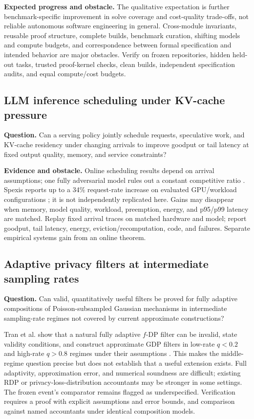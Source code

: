 \documentclass[11pt]{article}
\begin{document}
\textbf{Expected progress and obstacle.} The qualitative expectation is further benchmark-specific improvement in solve coverage and cost-quality trade-offs, not reliable autonomous software engineering in general. Cross-module invariants, reusable proof structure, complete builds, benchmark curation, shifting models and compute budgets, and correspondence between formal specification and intended behavior are major obstacles. Verify on frozen repositories, hidden held-out tasks, trusted proof-kernel checks, clean builds, independent specification audits, and equal compute/cost budgets.

\subsection{LLM inference scheduling under KV-cache pressure}
\textbf{Question.} Can a serving policy jointly schedule requests, speculative work, and KV-cache residency under changing arrivals to improve goodput or tail latency at fixed output quality, memory, and service constraints?

\textbf{Evidence and obstacle.} Online scheduling results depend on arrival assumptions; one fully adversarial model rules out a constant competitive ratio \citep{jaillet2025kv}. Spexis reports up to a 34\% request-rate increase on evaluated GPU/workload configurations \citep{jung2026spexis}; it is not independently replicated here. Gains may disappear when memory, model quality, workload, preemption, energy, and p95/p99 latency are matched. Replay fixed arrival traces on matched hardware and model; report goodput, tail latency, energy, eviction/recomputation, code, and failures. Separate empirical systems gain from an online theorem.

\subsection{Adaptive privacy filters at intermediate sampling rates}
\textbf{Question.} Can valid, quantitatively useful filters be proved for fully adaptive compositions of Poisson-subsampled Gaussian mechanisms in intermediate sampling-rate regimes not covered by current approximate constructions?

Tran et al. show that a natural fully adaptive $f$-DP filter can be invalid, state validity conditions, and construct approximate GDP filters in low-rate $q<0.2$ and high-rate $q>0.8$ regimes under their assumptions \citep{tran2026fdp}. This makes the middle-regime question precise but does not establish that a useful extension exists. Full adaptivity, approximation error, and numerical soundness are difficult; existing RDP or privacy-loss-distribution accountants may be stronger in some settings. The frozen event's comparator remains flagged as underspecified. Verification requires a proof with explicit assumptions and error bounds, and comparison against named accountants under identical composition models.
\end{document}
